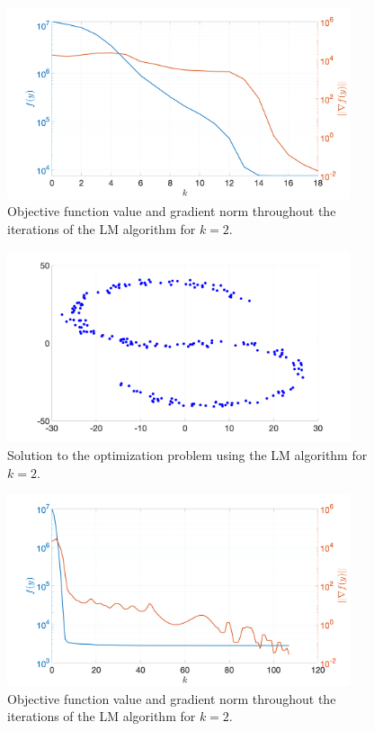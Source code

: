 \documentclass[12pt]{article}
\begin{document}
\begin{figure}[ht]
	\centering
	\includegraphics[width=0.9\textwidth]{figures/task3_LM_k_2.png}
	\caption{Objective function value and gradient norm throughout the iterations of the LM algorithm for $k=2$.}
	\label{fig:task3_LM_k_2}
\end{figure}

\begin{figure}[h!]
	\centering
	\includegraphics[width=0.9\textwidth]{figures/task3_lowerDim_k_2.png}
	\caption{Solution to the optimization problem using the LM algorithm for $k=2$.}
	\label{fig:task3_lowerDim_k_2}
\end{figure}

\begin{figure}[ht!]
	\centering
	\includegraphics[width=0.9\textwidth]{figures/task3_LM_k_3.png}
	\caption{Objective function value and gradient norm throughout the iterations of the LM algorithm for $k=2$.}
	\label{fig:task3_LM_k_3}
\end{figure}
\end{document}
